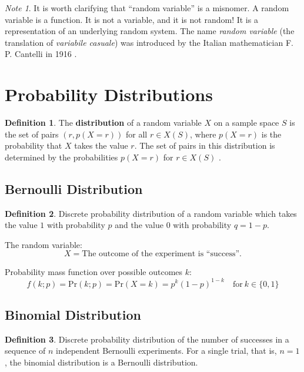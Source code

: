 \documentclass[12pt]{article}
\theoremstyle{plain}
\theoremstyle{definition}
\newtheorem{definition}{Definition}
\theoremstyle{remark}
\newtheorem*{note}{Note}
\begin{document}
\begin{note}
  It is worth clarifying that ``random variable'' is a misnomer.
  A random variable is a function.
  It is not a variable, and it is not random!
  It is a representation of an underlying random system.
  The name \textit{random variable} (the translation of
  \textit{variabile casuale}) was introduced by the Italian mathematician
  F. P. Cantelli in 1916 \citep{ros02}.
\end{note}

\section{Probability Distributions}

\begin{definition}
  The \textbf{distribution} of a random variable $X$ on a sample space $S$
  is the set of pairs $(r,p(X=r))$ for all $r \in X(S)$, where $p(X=r)$ is the
  probability that $X$ takes the value $r$.
  The set of pairs in this distribution is determined by the probabilities
  $p(X=r)$ for $r \in X(S)$ \citep{ros02}.
\end{definition}

\subsection{Bernoulli Distribution}

\begin{definition}
  Discrete probability distribution of a random variable which takes the value
  $1$ with probability $p$ and the value $0$ with probability $q=1-p$.
\end{definition}

The random variable:
\begin{equation*}
  X = \text{The outcome of the experiment is ``success''.}
\end{equation*}

Probability mass function over possible outcomes $k$:
\begin{equation*}\label{bernoulli}
  f(k;p) = \mathrm{Pr}(k;p) = \mathrm{Pr}(X=k) = p^k(1 - p)^{1-k}
  \quad \text{for}\ k \in \{0,1\}
\end{equation*}

\subsection{Binomial Distribution}

\begin{definition}
  Discrete probability distribution of the number of successes in a sequence of
  $n$ independent Bernoulli experiments.
  For a single trial, that is, $n=1$, the binomial distribution is a Bernoulli
  distribution.
\end{definition}
\end{document}

